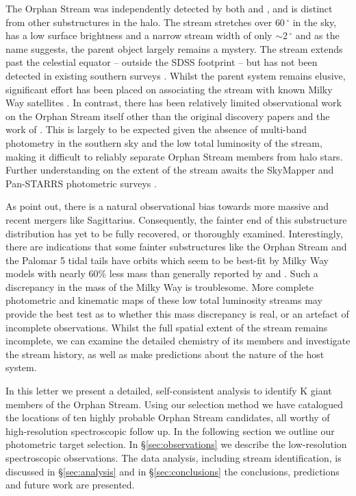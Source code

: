 \documentclass{emulateapj}
\begin{document}
The Orphan Stream was independently detected by both \citet{Grillmair;Dionatos_2006} and \citet{Belokurov;et-al_2006}, and is distinct from other substructures in the halo. The stream stretches over $60\,^\circ$ in the sky, has a low surface brightness and a narrow stream width of only $\sim$2\,$^\circ$ and as the name suggests, the parent object largely remains a mystery. The stream extends past the celestial equator \--- outside the SDSS footprint \--- but has not been detected in existing southern surveys \citep{Newberg;et-al_2010}. Whilst the parent system remains elusive, significant effort has been placed on associating the stream with known Milky Way satellites \citep{Zucker;et-al_2006, Fellhaur;et-al_2007,Jin;Lynden_Bell_2007,Sales;et-al_2008}. In contrast, there has been relatively limited observational work on the Orphan Stream itself other than the original discovery papers \citep{Grillmair;Dionatos_2006, Belokurov;et-al_2006, Belokurov;et-al_2007} and the work of \citet{Newberg;et-al_2010}. This is largely to be expected given the absence of multi-band photometry in the southern sky and the low total luminosity of the stream, making it difficult to reliably separate Orphan Stream members from halo stars. Further understanding on the extent of the stream awaits the SkyMapper and Pan-STARRS photometric surveys \citep{Keller;et-al_2007, Hodapp;et-al_2004}.

As \citet{Sales;et-al_2008} point out, there is a natural observational bias towards more massive and recent mergers like Sagittarius. Consequently, the fainter end of this substructure distribution has yet to be fully recovered, or thoroughly examined. Interestingly, there are indications that  some fainter substructures like the Orphan Stream and the Palomar 5 tidal tails \citep{Odenkirchen;et-al_2009} have orbits which seem to be best-fit by Milky Way models with nearly 60\% less mass \citep{Newberg;et-al_2010} than generally reported by \citet{Xue;et-al_2008} and \citet{Koposov;et-al_2010}. Such a discrepancy in the mass of the Milky Way is troublesome. More complete photometric and kinematic maps of these low total luminosity streams may provide the best test as to whether this mass discrepancy is real, or an artefact of incomplete observations. Whilst the full spatial extent of the stream remains incomplete, we can examine the detailed chemistry of its members and investigate the stream history, as well as make predictions about the nature of the host system.

In this letter we present a detailed, self-consistent analysis to identify K giant members of the Orphan Stream. Using our selection method we have catalogued the locations of ten highly probable Orphan Stream candidates, all worthy of high-resolution spectroscopic follow up. In the following section we outline our photometric target selection. In \S\ref{sec:observations} we describe the low-resolution spectroscopic observations. The data analysis, including stream identification, is discussed in \S\ref{sec:analysis} and in \S\ref{sec:conclusions} the conclusions, predictions and future work are presented.
\end{document}
